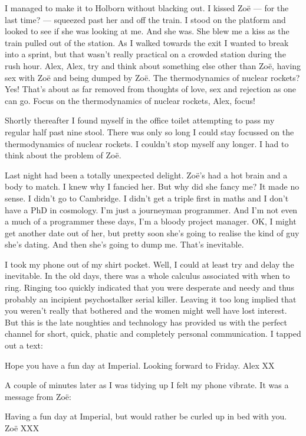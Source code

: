I managed to make it to Holborn without blacking out. I kissed
Zoë --- for the last time? --- squeezed past her and off the
train. I stood on the platform and looked to see if she was looking
at me. And she was. She blew me a kiss as the train pulled out of
the station. As I walked towards the exit I wanted to break into a
sprint, but that wasn't really practical on a crowded station during
the rush hour. Alex, Alex, try and think about something else other
than Zoë, having sex with Zoë and being dumped by Zoë.
The thermodynamics of nuclear rockets? Yes! That's about as far
removed from thoughts of love, sex and rejection as one can go.
Focus on the thermodynamics of nuclear rockets, Alex, focus!

Shortly thereafter I found myself in the office toilet attempting to
pass my regular half past nine stool. There was only so long I could
stay focussed on the thermodynamics of nuclear rockets. I couldn't
stop myself any longer. I had to think about the problem of Zoë.

Last night had been a totally unexpected delight. Zoë's had a
hot brain and a body to match. I knew why I fancied her. But why did
she fancy me? It made no sense. I didn't go to Cambridge. I didn't
get a triple first in maths and I don't have a PhD in cosmology. I'm
just a journeyman programmer. And I'm not even a much of a
programmer these days, I'm a bloody project manager. OK, I might get
another date out of her, but pretty soon she's going to realise the
kind of guy she's dating. And then she's going to dump me. That's
inevitable.

I took my phone out of my shirt pocket. Well, I could at least try
and delay the inevitable. In the old days, there was a whole
calculus associated with when to ring. Ringing too quickly indicated
that you were desperate and needy and thus probably an incipient
psychostalker serial killer. Leaving it too long implied that you
weren't really that bothered and the women might well have lost
interest. But this is the late noughties and technology has provided
us with the perfect channel for short, quick, phatic and completely
personal communication. I tapped out a text:

\vskip 12pt
{\twelvett Hope you have a fun day at Imperial. Looking forward to
Friday. Alex XX}
\vskip 12pt

A couple of minutes later as I was tidying up I felt my phone
vibrate. It was a message from Zoë:

\vskip 12pt
{\twelvett Having a fun day at Imperial, but would rather be curled
up in bed with you. Zoë XXX}
\vskip 12pt

